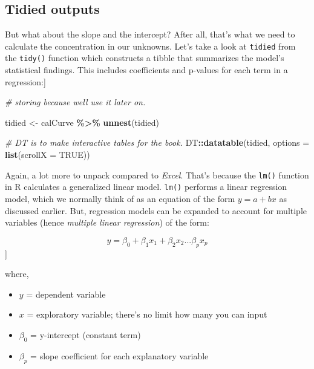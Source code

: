 \documentclass[
]{book}
\newenvironment{Shaded}{\begin{snugshade}}{\end{snugshade}}
\newcommand{\AttributeTok}[1]{\textcolor[rgb]{0.13,0.29,0.53}{#1}}
\newcommand{\CommentTok}[1]{\textcolor[rgb]{0.56,0.35,0.01}{\textit{#1}}}
\newcommand{\ConstantTok}[1]{\textcolor[rgb]{0.56,0.35,0.01}{#1}}
\newcommand{\FunctionTok}[1]{\textcolor[rgb]{0.13,0.29,0.53}{\textbf{#1}}}
\newcommand{\NormalTok}[1]{#1}
\newcommand{\OtherTok}[1]{\textcolor[rgb]{0.56,0.35,0.01}{#1}}
\newcommand{\SpecialCharTok}[1]{\textcolor[rgb]{0.81,0.36,0.00}{\textbf{#1}}}
\providecommand{\tightlist}{%
  \setlength{\itemsep}{0pt}\setlength{\parskip}{0pt}}
\begin{document}
\hypertarget{tidied-outputs}{%
\subsection{Tidied outputs}\label{tidied-outputs}}

But what about the slope and the intercept? After all, that's what we need to calculate the concentration in our unknowns. Let's take a look at \texttt{tidied} from the \texttt{tidy()} function which constructs a tibble that summarizes the model's statistical findings. This includes coefficients and p-values for each term in a regression:{]}

\begin{Shaded}
\begin{Highlighting}[]
\CommentTok{\# storing because we\textquotesingle{}ll use it later on. }

\NormalTok{tidied }\OtherTok{\textless{}{-}}\NormalTok{ calCurve }\SpecialCharTok{\%\textgreater{}\%} 
  \FunctionTok{unnest}\NormalTok{(tidied)}

\CommentTok{\# DT is to make interactive tables for the book.}
\NormalTok{DT}\SpecialCharTok{::}\FunctionTok{datatable}\NormalTok{(tidied, }
              \AttributeTok{options =} \FunctionTok{list}\NormalTok{(}\AttributeTok{scrollX =} \ConstantTok{TRUE}\NormalTok{))}
\end{Highlighting}
\end{Shaded}

Again, a lot more to unpack compared to \emph{Excel}. That's because the \texttt{lm()} function in R calculates a generalized linear model. \texttt{lm()} performs a linear regression model, which we normally think of as an equation of the form \(y= a + bx\) as discussed earlier. But, regression models can be expanded to account for multiple variables (hence \emph{multiple linear regression}) of the form:

\[y = \beta _{0} + \beta _{1} x_{1} + \beta _{2} x_{2} ... \beta _{p} x_{p}\]{]}

where,

\begin{itemize}
\tightlist
\item
  \(y\) = dependent variable
\item
  \(x\) = exploratory variable; there's no limit how many you can input
\item
  \(\beta _{0}\) = y-intercept (constant term)
\item
  \(\beta _{p}\) = slope coefficient for each explanatory variable
\end{itemize}
\end{document}
